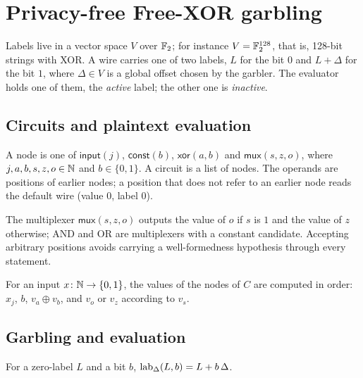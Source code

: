 \chapter{Privacy-free Free-XOR garbling}
\label{chap:garbling}

Labels live in a vector space $V$ over $\mathbb{F}_2$; for instance $V = \mathbb{F}_2^{128}$, that is,
128-bit strings with XOR. A wire carries one of two labels, $L$ for the bit $0$ and $L + \Delta$
for the bit $1$, where $\Delta \in V$ is a global offset chosen by the garbler. The evaluator
holds one of them, the \emph{active} label; the other one is \emph{inactive}.

\section{Circuits and plaintext evaluation}

\begin{definition}[Circuits]
  \label{def:circuit}
  \leanok
  A node is one of $\mathsf{input}(j)$, $\mathsf{const}(b)$, $\mathsf{xor}(a, b)$ and
  $\mathsf{mux}(s, z, o)$, where $j, a, b, s, z, o \in \mathbb{N}$ and $b \in \{0, 1\}$. A circuit is a
  list of nodes. The operands are positions of earlier nodes; a position that does not refer to
  an earlier node reads the default wire (value $0$, label $0$).
\end{definition}

The multiplexer $\mathsf{mux}(s, z, o)$ outputs the value of $o$ if $s$ is $1$ and the value
of $z$ otherwise; AND and OR are multiplexers with a constant candidate. Accepting arbitrary
positions avoids carrying a well-formedness hypothesis through every statement.

\begin{definition}
  \label{def:plain}
  \leanok
  For an input $x \colon \mathbb{N} \to \{0, 1\}$, the values of the nodes of $C$ are computed in order:
  $x_j$, $b$, $v_a \oplus v_b$, and $v_o$ or $v_z$ according to $v_s$.
\end{definition}

\section{Garbling and evaluation}

\begin{definition}
  \label{def:lab}
  \leanok
  For a zero-label $L$ and a bit $b$, $\operatorname{lab}_\Delta(L, b) = L + b\,\Delta$.
\end{definition}

